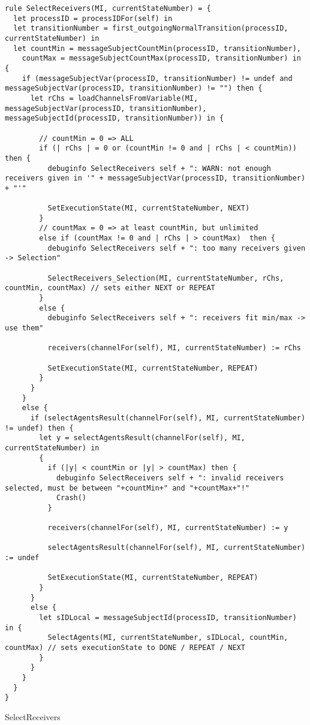 \begin{listing}[H]
\begin{verbatim}
rule SelectReceivers(MI, currentStateNumber) = {
  let processID = processIDFor(self) in
  let transitionNumber = first_outgoingNormalTransition(processID, currentStateNumber) in
  let countMin = messageSubjectCountMin(processID, transitionNumber),
    countMax = messageSubjectCountMax(processID, transitionNumber) in {
    if (messageSubjectVar(processID, transitionNumber) != undef and messageSubjectVar(processID, transitionNumber) != "") then {
      let rChs = loadChannelsFromVariable(MI, messageSubjectVar(processID, transitionNumber), messageSubjectId(processID, transitionNumber)) in {

        // countMin = 0 => ALL
        if (| rChs | = 0 or (countMin != 0 and | rChs | < countMin)) then {
          debuginfo SelectReceivers self + ": WARN: not enough receivers given in '" + messageSubjectVar(processID, transitionNumber) + "'"

          SetExecutionState(MI, currentStateNumber, NEXT)
        }
        // countMax = 0 => at least countMin, but unlimited
        else if (countMax != 0 and | rChs | > countMax)  then {
          debuginfo SelectReceivers self + ": too many receivers given -> Selection"

          SelectReceivers_Selection(MI, currentStateNumber, rChs, countMin, countMax) // sets either NEXT or REPEAT
        }
        else {
          debuginfo SelectReceivers self + ": receivers fit min/max -> use them"

          receivers(channelFor(self), MI, currentStateNumber) := rChs

          SetExecutionState(MI, currentStateNumber, REPEAT)
        }
      }
    }
    else {
      if (selectAgentsResult(channelFor(self), MI, currentStateNumber) != undef) then {
        let y = selectAgentsResult(channelFor(self), MI, currentStateNumber) in
        {
          if (|y| < countMin or |y| > countMax) then {
            debuginfo SelectReceivers self + ": invalid receivers selected, must be between "+countMin+" and "+countMax+"!"
            Crash()
          }

          receivers(channelFor(self), MI, currentStateNumber) := y

          selectAgentsResult(channelFor(self), MI, currentStateNumber) := undef

          SetExecutionState(MI, currentStateNumber, REPEAT)
        }
      }
      else {
        let sIDLocal = messageSubjectId(processID, transitionNumber) in {
          SelectAgents(MI, currentStateNumber, sIDLocal, countMin, countMax) // sets executionState to DONE / REPEAT / NEXT
        }
      }
    }
  }
}
\end{verbatim}
\caption{SelectReceivers}
\label{lst:asm:SelectReceivers}
\end{listing}




